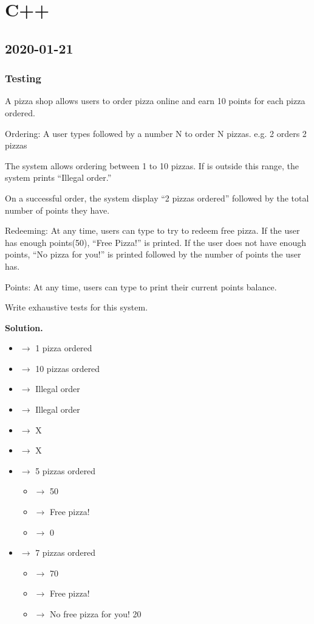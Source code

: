 \chapter{C++}
\section{2020-01-21}
\subsection{Testing}
A pizza shop allows users to order pizza online and earn 10 points for each pizza
ordered.

Ordering: A user types  followed by a number N to order N pizzas.
e.g.  2 orders 2 pizzas

The system allows ordering between 1 to 10 pizzas.
If  is outside this range, the system prints ``Illegal order.''

On a successful order, the system display ``2 pizzas ordered''
followed by the total number of points they have.

Redeeming: At any time, users can type  to try to redeem free pizza.
If the user has enough points(50), ``Free Pizza!'' is printed.
If the user does not have enough points, ``No pizza for you!''
is printed followed by the number of points the user has.

Points: At any time, users can type  to print their current points balance.

Write exhaustive tests for this system.

\textbf{Solution.}

\begin{itemize}
    \item {} $ \rightarrow $ 1 pizza ordered
    \item {} $ \rightarrow $ 10 pizzas ordered
    \item {} $ \rightarrow $ Illegal order
    \item {} $ \rightarrow $ Illegal order
    \item {} $ \rightarrow $ X
    \item {} $ \rightarrow $ X
    \item {} $ \rightarrow $ 5 pizzas ordered
          \begin{itemize}
              \item {} $ \rightarrow $ 50
              \item {} $ \rightarrow $ Free pizza!
              \item {} $ \rightarrow $ 0
          \end{itemize}
    \item {} $ \rightarrow $ 7 pizzas ordered
          \begin{itemize}
              \item {} $ \rightarrow $ 70
              \item {} $ \rightarrow $ Free pizza!
              \item {} $ \rightarrow $ No free pizza for you! 20
          \end{itemize}
\end{itemize}

